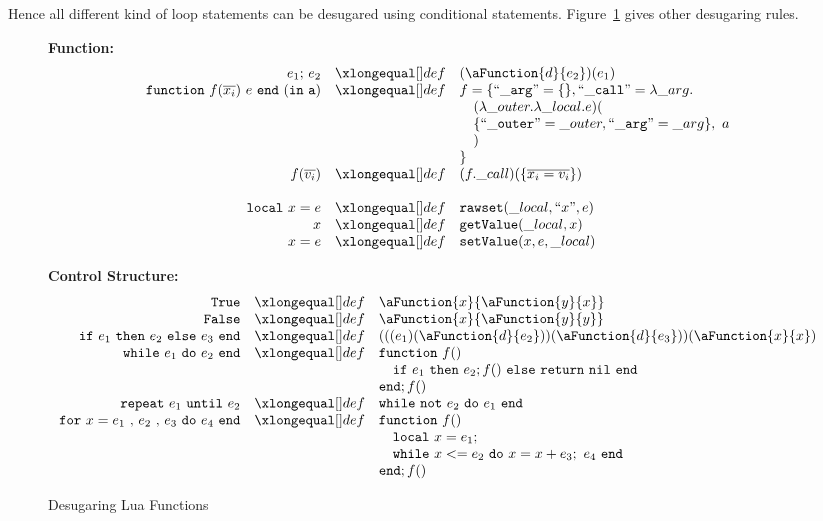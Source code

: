 Hence all different kind of loop statements can be desugared using conditional statements. Figure~\ref{fig:desLuaFunc} gives other desugaring rules.

\begin{figure}
\caption{Desugaring Lua Functions}\label{fig:desLuaFunc}
{\bf Function:}\[
\begin{array}{rclcl}
\desugar{e_1{\tt ;}~e_2}{(\aFunction{d}{e_2})(e_1)}
\desugar{{\tt function}~f(\overline{x_i})~e~{\tt end} ~({\tt in~a})}{f = \{ {\tt ``\_arg"} = \{\}, {\tt ``\_call"} = \lambda\_arg.}
\desugarline{
  \quad(\lambda\_outer.\lambda\_local.e)(\\
  \quad\{{\tt ``\_outer"} = \_outer, {\tt ``\_arg" }= \_arg\}, ~a\\
  \quad)\\
\}
}
\desugar{f(\overline{v_i})}{(f.\_call)(\{\overline{x_i = v_i}\})}
\\
\desugar{{\tt local}~x=e}{{\tt rawset}(\_local, ``x", e)}
\desugar{x}{{\tt getValue}(\_local, x)}
\desugar{x=e}{{\tt setValue}(x, e, \_local)}

\end{array}\]


{\bf Control Structure:}\[
\begin{array}{rclcl}

\desugar{\tt True}{\aFunction{x}{\aFunction{y}{x}}}
\desugar{\tt False}{\aFunction{x}{\aFunction{y}{y}}}
\desugar{
    {\tt if}~e_1~{\tt then}~e_2~{\tt else}~e_3~{\tt end}
}{
    (((e_1)(\aFunction{d}{e_2}))(\aFunction{d}{e_3}))(\aFunction{x}{x})
}
\desugar{{\tt while}~e_1~{\tt do}~e_2~{\tt end}}{
    {\tt function}~f()
}
\desugarline{ \quad{\tt if}~e_1~{\tt then}~e_2;f()~{\tt else}~{\tt return}~{\tt nil}~{\tt end}\\
{\tt end};f()
}
\desugar{{\tt repeat}~e_1~{\tt until}~e_2}{
   {\tt while}~{\tt not}~e_2~{\tt do}~e_1~{\tt end}\\
}
\desugar{{\tt for}~x=e_1~{\tt ,}~e_2~{\tt ,}~e_3~{\tt do}~e_4~{\tt end}}{
    {\tt function}~f()
}
\desugarline{
    \quad {\tt local}~x = e_1;\\
    \quad {\tt while}~x<= e_2~{\tt do}~x = x + e_3;~e_4~{\tt end}\\
    {\tt end};f()\\
}
\end{array}\]
\end{figure}


